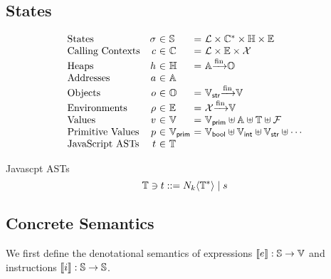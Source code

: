 \subsection{States}
\[
  \begin{array}{lr@{~}c@{~}l@{~}c@{~}l}
    \text{States} & \st &\in& \stset &=&
    \labset \times \ctxtset^* \times \heapset \times \envset\\

    \text{Calling Contexts} & \ctxt &\in& \ctxtset &=&
    \labset \times \envset \times \varset\\

    \text{Heaps} & \heap &\in& \heapset &=&
    \addrset \finmap \objset\\

    \text{Addresses} & \addr &\in& \addrset\\

    \text{Objects} & \obj &\in& \objset &=&
    \strset \finmap \valset\\

    \text{Environments} & \env &\in& \envset &=&
    \varset \finmap \valset\\

    \text{Values} & \val &\in& \valset &=&
    \pvalset \uplus \addrset \uplus \treeset \uplus \funcset\\

    \text{Primitive Values} & \pval &\in& \pvalset &=&
    \boolset \uplus \intset \uplus \strset \uplus \cdots\\

    \text{JavaScript ASTs} & \tree &\in& \treeset\\
  \end{array}
\]

Javascpt ASTs
\[
  \mathbb{T} \ni t ::= N_k \langle \mathbb{T}^* \rangle \mid s
\]


\subsection{Concrete Semantics}
We first define the denotational semantics of expressions
$\llbracket{e}\rrbracket: \mathbb{S} \rightarrow \mathbb{V}$
and instructions
$\llbracket{i}\rrbracket: \mathbb{S} \rightarrow \mathbb{S}$.


